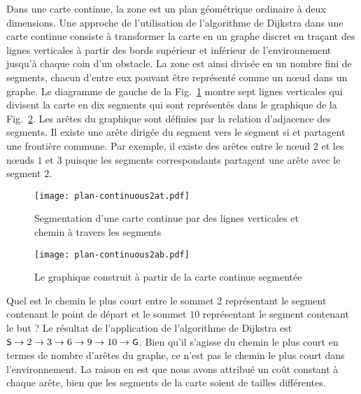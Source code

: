 Dans une carte continue, la zone est un plan géométrique ordinaire à deux dimensions. Une approche de l'utilisation de l'algorithme de Dijkstra dans une carte continue consiste à transformer la carte en un graphe discret en traçant des lignes verticales à partir des bords supérieur et inférieur de l'environnement jusqu'à chaque coin d'un obstacle. La zone est ainsi divisée en un nombre fini de segments, chacun d'entre eux pouvant être représenté comme un nœud dans un graphe. Le diagramme de gauche de la Fig.~\ref{fig.map-graph-at} montre sept lignes verticales qui divisent la carte en dix segments qui sont représentés dans le graphique de la Fig.~\ref{fig.map-graph-ab}. Les arêtes du graphique sont définies par la relation d'adjacence des segments. Il existe une arête dirigée du segment  vers le segment  si  et  partagent une frontière commune. Par exemple, il existe des arêtes entre le nœud $2$ et les nœuds $1$ et $3$ puisque les segments correspondants partagent une arête avec le segment $2$.

\begin{figure}
\begin{center}
\texttt{[image: plan-continuous2at.pdf]}
\end{center}
\caption{Segmentation d'une carte continue par des lignes verticales et chemin à travers les segments}\label{fig.map-graph-at}
\end{figure}

\begin{figure}
\begin{center}
\texttt{[image: plan-continuous2ab.pdf]}
\end{center}
\caption{Le graphique construit à partir de la carte continue segmentée}\label{fig.map-graph-ab}
\end{figure}

Quel est le chemin le plus court entre le sommet $2$ représentant le segment contenant le point de départ et le sommet $10$ représentant le segment contenant le but ? Le résultat de l'application de l'algorithme de Dijkstra est $\textsf{\small S} \rightarrow 2\rightarrow 3\rightarrow 6\rightarrow 9\rightarrow 10 \rightarrow \textsf{\small G}$. Bien qu'il s'agisse du chemin le plus court en termes de nombre d'arêtes du graphe, ce n'est pas le chemin le plus court dans l'environnement. La raison en est que nous avons attribué un coût constant à chaque arête, bien que les segments de la carte soient de tailles différentes. 

